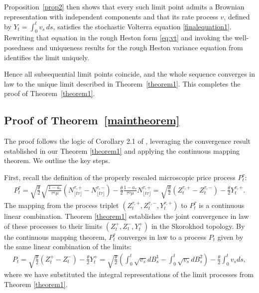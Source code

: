 \documentclass[letterpaper]{article}
\numberwithin{equation}{section}
\theoremstyle{definition}
\theoremstyle{remark}
\begin{document}
Proposition~\ref{prop2} then shows that every such limit point admits a Brownian representation with independent components and that its rate process $v$, defined by $Y_t=\int_0^t v_s\,ds$, satisfies the stochastic Volterra equation \eqref{finalequation1}. Rewriting that equation in the rough Heston form \eqref{eq:vt} and invoking the well-posedness and uniqueness results for the rough Heston variance equation from \cite{el2019characteristic} identifies the limit uniquely.

Hence all subsequential limit points coincide, and the whole sequence converges in law to the unique limit described in Theorem~\ref{theorem1}. This completes the proof of Theorem~\ref{theorem1}.


\subsection{Proof of Theorem~\ref{maintheorem}}\label{sec:proofoftheorem2}
The proof follows the logic of Corollary 2.1 of \cite{el2019characteristic}, leveraging the convergence result established in our Theorem \ref{theorem1} and applying the continuous mapping theorem. We outline the key steps.

First, recall the definition of the properly rescaled microscopic price process $P_t^\tau$:
\begin{align*}
    {P_t^{\tau}}
    = {\sqrt{\frac{\theta}{2}}\sqrt{\frac{1-a_{\tau}}{\tau^\alpha\mu}}\left( N_{\lfloor t\tau\rfloor}^{\tau,+}-N_{\lfloor t\tau\rfloor}^{\tau,-} \right)-\frac\theta2\frac{1-a_{\tau}}{\tau^\alpha\mu}N_{\lfloor t\tau\rfloor}^{\tau,+}} = {\sqrt{\frac{\theta}{2}}\left(Z_t^{\tau,+} - Z_t^{\tau,-}\right) - \frac{\theta}{2} Y_t^{\tau,+}.}
\end{align*}
The mapping from the process triplet $(Z_t^{\tau,+}, Z_t^{\tau,-}, Y_t^{\tau,+})$ to $P_t^\tau$ is a continuous linear combination. Theorem \ref{theorem1} establishes the joint convergence in law of these processes to their limits $(Z_t^+, Z_t^-, Y_t^+)$ in the Skorokhod topology. By the continuous mapping theorem, $P_t^\tau$ converges in law to a process $P_t$ given by the same linear combination of the limits:
\begin{align*}
 P_t = {\sqrt{\frac{\theta}{2}}(Z_t^+ - Z_t^-) - \frac{\theta}{2} Y_t^+} = \sqrt{\frac{\theta}{2}} \left( \int_0^t \sqrt{v_s} dB_s^1 - \int_0^t \sqrt{v_s} dB_s^2 \right) - \frac{\theta}{2} \int_0^t v_s ds,
\end{align*}
where we have substituted the integral representations of the limit processes from Theorem \ref{theorem1}.
\end{document}
